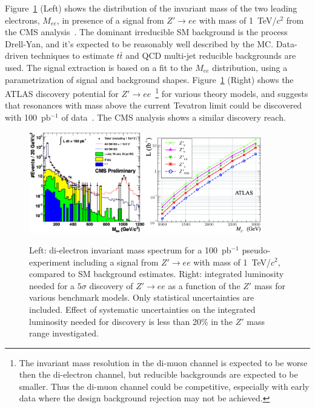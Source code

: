 \documentclass{cimento}
\begin{document}
Figure~\ref{fig:MeeAndZPrimeDisc} (Left) shows the distribution of 
the invariant mass of the two leading electrons, $M_{ee}$, in presence of 
a signal from $Z' \rightarrow ee$ with mass of 1~TeV/$c^2$
from the CMS analysis~\cite{HEEPNOTE}. The dominant irreducible SM background 
is the process Drell-Yan, and it's expected to be 
reasonably well described by the MC. Data-driven techniques to estimate $t\bar{t}$ and QCD multi-jet
reducible backgrounds are used. The signal extraction is based on a fit 
to the $M_{ee}$ distribution, using a parametrization of signal and 
background shapes. Figure~\ref{fig:MeeAndZPrimeDisc} (Right)
shows the ATLAS discovery potential for 
$Z' \rightarrow ee$~\footnote{The invariant 
mass resolution in the di-muon channel is expected to be 
worse then the di-electron channel, 
but reducible backgrounds are expected to be smaller. 
Thus the di-muon channel could be competitive, 
especially with early data where the design background rejection may not be 
achieved.} for various theory 
models, and suggests that resonances with mass 
above the current Tevatron limit could be discovered with 
100~pb$^{-1}$ of data~\cite{DiLepResonancesATLAS}. 
The CMS analysis shows a similar discovery reach.

\begin{figure}[htbp] 
\centering
\includegraphics[width=0.45\textwidth]{st_mass_all_withZPrime_ALLTOPO.eps}\includegraphics[width=0.45\textwidth]{fig9L.eps}
\caption{Left: di-electron invariant mass spectrum for a 
100~pb$^{-1}$ pseudo-experiment including a signal from 
$Z' \rightarrow ee$ with mass of 1~TeV/$c^2$, 
compared to SM background estimates. Right: integrated 
luminosity needed for a $5\sigma$ discovery of $Z' \rightarrow ee$
as a function of the $Z'$ mass for various benchmark models. Only 
statistical uncertainties are included. 
Effect of systematic uncertainties on the integrated luminosity 
needed for discovery is less than 20\% in the $Z'$ mass
range investigated.}
\label{fig:MeeAndZPrimeDisc}
\end{figure}
\end{document}
